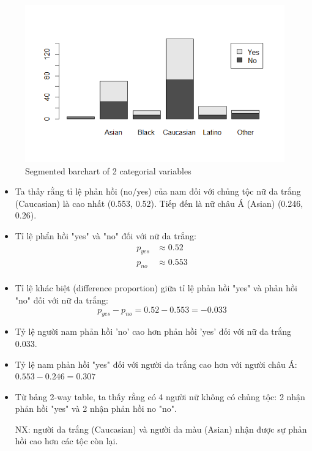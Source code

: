 \documentclass[a4paper,12pt]{article}
\begin{document}
	\begin{figure}[H]
		\centering
		\includegraphics[width=0.7\linewidth]{Images/drplot}
		\caption{Segmented barchart of 2 categorial variables}
		\label{fig:drplot}
	\end{figure}
	
	
	\begin{itemize}
		\item Ta thấy rằng tỉ lệ phản hồi (no/yes) của nam đối với chủng tộc nữ da trắng (Caucasian) là cao nhất (0.553, 0.52). Tiếp đến là nữ châu Á (Asian) (0.246, 0.26).
		\item Tỉ lệ phẩn hồi "yes" và "no" đối với nữ da trắng:
		\begin{align*}
			p_{yes} &\approx 0.52 \\
			p_{no} &\approx 0.553 \\
		\end{align*}
		
		\item Tỉ lệ khác biệt (difference proportion) giữa tỉ lệ phản hồi "yes" và phản hồi "no" đối với nữ da trắng:
		$$p_{yes} - p_{no} = 0.52 -0.553 = -0.033$$
		\item[\textrightarrow] Tỷ lệ người nam phản hồi 'no' cao hơn phản hồi 'yes' đối với nữ da trắng 0.033.
		
		\item Tỷ lệ nam phản hồi "yes" đối với người da trắng cao hơn với người châu Á: $0.553 - 0.246 = 0.307$
		
		\item Từ bảng 2-way table, ta thấy rằng có 4 người nữ không có chủng tộc: 2 nhận phản hồi "yes" và 2 nhận phản hồi no "no". 
		
		NX: người da trắng (Caucasian) và người da màu (Asian) nhận được sự phản hồi cao hơn các tộc còn lại.
	\end{itemize}
	
\end{document}
